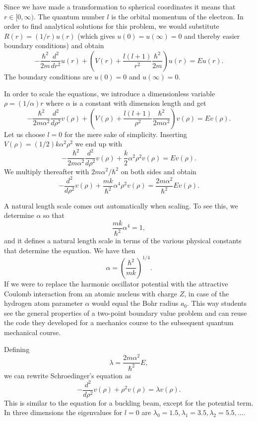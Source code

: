 \documentclass[graybox,envcountchap,sectrefs]{svmult}
\begin{document}
Since we have made a transformation to spherical coordinates it means
that $r\in [0,\infty)$. The quantum number $l$ is the orbital momentum
  of the electron.  In order to find analytical solutions for this
  problem, we would substitute $R(r) = (1/r) u(r)$ (which gives
  $u(0)=u(\infty)=0$ and thereby easier boundary conditions) and
  obtain
\[
  -\frac{\hbar^2}{2 m} \frac{d^2}{dr^2} u(r)
       + \left ( V(r) + \frac{l (l + 1)}{r^2}\frac{\hbar^2}{2 m}
                                    \right ) u(r)  = E u(r) .
\]
The boundary conditions are $u(0)=0$ and $u(\infty)=0$.

In order to scale the equations, we introduce a dimensionless variable $\rho = (1/\alpha) r$
where $\alpha$ is a constant with dimension length and get
\[
  -\frac{\hbar^2}{2 m \alpha^2} \frac{d^2}{d\rho^2} v(\rho)
       + \left ( V(\rho) + \frac{l (l + 1)}{\rho^2}
         \frac{\hbar^2}{2 m\alpha^2} \right ) v(\rho)  = E v(\rho) .
\]
Let us choose $l=0$ for the mere sake of simplicity.
Inserting $V(\rho) = (1/2) k \alpha^2\rho^2$ we end up with
\[
  -\frac{\hbar^2}{2 m \alpha^2} \frac{d^2}{d\rho^2} v(\rho)
       + \frac{k}{2} \alpha^2\rho^2v(\rho)  = E v(\rho).
\]
We multiply thereafter with $2m\alpha^2/\hbar^2$ on both sides and obtain
\[
  -\frac{d^2}{d\rho^2} v(\rho)
       + \frac{mk}{\hbar^2} \alpha^4\rho^2v(\rho)  = \frac{2m\alpha^2}{\hbar^2}E v(\rho) .
\]

A natural length scale comes out automatically when scaling. To see this,
we determine $\alpha$  so that
\[
\frac{mk}{\hbar^2} \alpha^4 = 1,
\]
and it defines a natural length scale in terms of the various physical
constants that determine the equation.  We have then
\[
\alpha = \left(\frac{\hbar^2}{mk}\right)^{1/4}.
\]
If we were to replace the harmonic oscillator potential with the
attractive Coulomb interaction from an atomic nucleus with charge $Z$,
in case of the hydrogen atom parameter $\alpha$ would equal the Bohr
radius $a_0$.  This way students see the general properties of a
two-point boundary value problem and can reuse the code they developed
for a mechanics course to the subsequent quantum mechanical course.

Defining
\[
\lambda = \frac{2m\alpha^2}{\hbar^2}E,
\]
we can rewrite Schroedinger's equation as
\[
  -\frac{d^2}{d\rho^2} v(\rho) + \rho^2v(\rho)  = \lambda v(\rho) .
\]
This is similar to the equation for a buckling beam, except for the
potential term.  In three dimensions the eigenvalues for $l=0$ are
$\lambda_0=1.5,\lambda_1=3.5,\lambda_2=5.5,\dots .$
\end{document}
